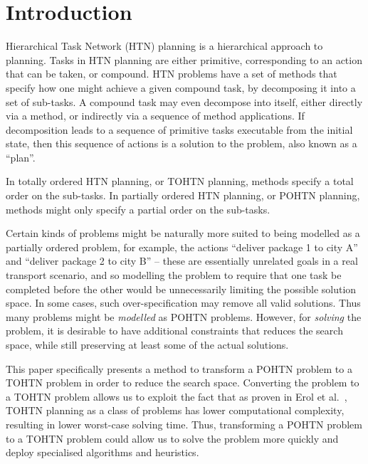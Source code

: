 \documentclass[runningheads]{llncs}
\begin{document}
 
 
\section{Introduction}
Hierarchical Task Network (HTN) planning \cite{HTNSurvey} \cite{IntroGhallab} is a hierarchical approach to planning. Tasks in HTN planning are either primitive, corresponding to an action that can be taken, or compound. HTN problems have a set of methods that specify how one might achieve a given compound task, by decomposing it into a set of sub-tasks. A compound task may even decompose into itself, either directly via a method, or indirectly via a sequence of method applications. If decomposition leads to a sequence of primitive tasks executable from the initial state, then this sequence of actions is a solution to the problem, also known as a \enquote{plan}.

In totally ordered HTN planning, or TOHTN planning, methods specify a total order on the sub-tasks. In partially ordered HTN planning, or POHTN planning, methods might only specify a partial order on the sub-tasks. 


Certain kinds of problems might be naturally more suited to being modelled as a partially ordered problem, for example, the actions \enquote{deliver package 1 to city A} and \enquote{deliver package 2 to city B} -- these are essentially unrelated goals in a real transport scenario, and so modelling the problem to require that one task be completed before the other would be unnecessarily limiting the possible solution space. In some cases, such over-specification may remove all valid solutions. Thus many problems might be \emph{modelled} as POHTN problems. However, for \emph{solving} the problem, it is desirable to have additional constraints that reduces the search space, while still preserving at least some of the actual solutions.

This paper specifically presents a method to transform a POHTN problem to a TOHTN problem in order to reduce the search space. Converting the problem to a TOHTN problem allows us to exploit the fact that as proven in Erol et al.\ \cite{ErolHTNExpressivity},  TOHTN planning as a class of problems has lower computational complexity, resulting in lower worst-case solving time. 
Thus, transforming a POHTN problem to a TOHTN problem could allow us to solve the problem more quickly and deploy specialised algorithms and heuristics.
\end{document}
